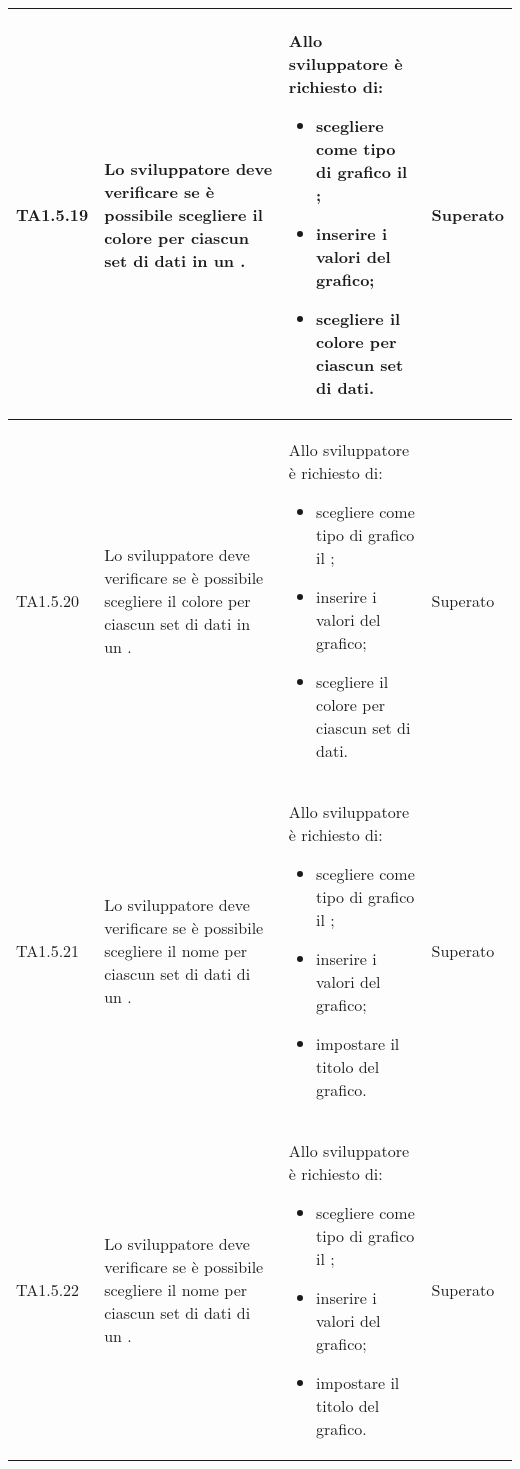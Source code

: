 \begin{longtabu}{| X[0.5] | X | X | X[0.5] |}
	TA1.5.19 & Lo sviluppatore deve verificare se è possibile scegliere il colore per ciascun set di dati in un .

		& Allo sviluppatore è richiesto di:
		\begin{itemize}
			\item scegliere come tipo di grafico il ;
			\item inserire i valori del grafico;
			\item scegliere il colore per ciascun set di dati.
		\end{itemize}
& Superato \\ \hline

	TA1.5.20 & Lo sviluppatore deve verificare se è possibile scegliere il colore per ciascun set di dati in un .

		& Allo sviluppatore è richiesto di:
		\begin{itemize}
			\item scegliere come tipo di grafico il ;
			\item inserire i valori del grafico;
			\item scegliere il colore per ciascun set di dati.
		\end{itemize}
& Superato \\ \hline

	TA1.5.21 & Lo sviluppatore deve verificare se è possibile scegliere il nome per ciascun set di dati di un .

		& Allo sviluppatore è richiesto di:
		\begin{itemize}
			\item scegliere come tipo di grafico il ;
			\item inserire i valori del grafico;
			\item impostare il titolo del grafico.
		\end{itemize}
& Superato \\ \hline

	TA1.5.22 & Lo sviluppatore deve verificare se è possibile scegliere il nome per ciascun set di dati di un .

		& Allo sviluppatore è richiesto di:
		\begin{itemize}
			\item scegliere come tipo di grafico il ;
			\item inserire i valori del grafico;
			\item impostare il titolo del grafico.
		\end{itemize}
& Superato \\ \hline


\end{longtabu}
